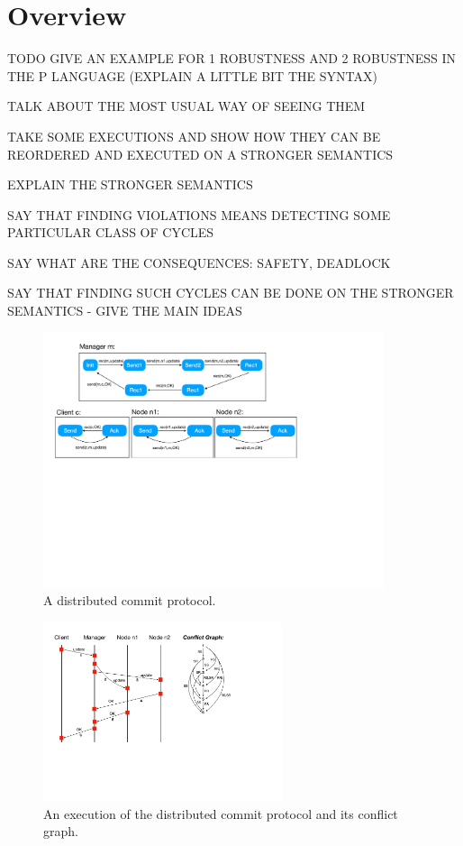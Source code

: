 \section{Overview}

TODO GIVE AN EXAMPLE FOR 1 ROBUSTNESS AND 2 ROBUSTNESS IN THE P LANGUAGE (EXPLAIN A LITTLE BIT THE SYNTAX)

TALK ABOUT THE MOST USUAL WAY OF SEEING THEM

TAKE SOME EXECUTIONS AND SHOW HOW THEY CAN BE REORDERED AND EXECUTED ON A STRONGER SEMANTICS

EXPLAIN THE STRONGER SEMANTICS

SAY THAT FINDING VIOLATIONS MEANS DETECTING SOME PARTICULAR CLASS OF CYCLES

SAY WHAT ARE THE CONSEQUENCES: SAFETY, DEADLOCK

SAY THAT FINDING SUCH CYCLES CAN BE DONE ON THE STRONGER SEMANTICS - GIVE THE MAIN IDEAS

\begin{figure}
\includegraphics[width=10cm]{commit.pdf}
\caption{A distributed commit protocol.}
\label{fig:commit}
\end{figure}

\begin{figure}
\includegraphics[width=7cm]{MSC-commit.pdf}
\caption{An execution of the distributed commit protocol and its conflict graph.}
\label{fig:commit-exec}
\end{figure}

